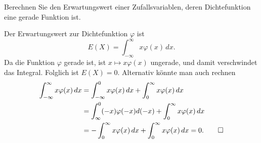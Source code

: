 Berechnen Sie den Erwartungswert einer Zufallsvariablen, deren
Dichtefunktion eine gerade Funktion ist.


\begin{loesung}
Der Erwartungswert zur Dichtefunktion $\varphi$ ist
\[
E(X)=\int_{-\infty}^\infty x\varphi(x)\,dx.
\]
Da die Funktion $\varphi$ gerade ist, ist $x\mapsto x\varphi(x)$
ungerade, und damit verschwindet das Integral. Folglich ist $E(X)=0$.
Alternativ könnte man auch rechnen
\begin{align*}
\int_{-\infty}^\infty x\varphi(x)\,dx
&=\int_{-\infty}^0x\varphi(x)\,dx +\int_0^\infty x\varphi(x)\,dx\\
&=\int_{\infty}^0(-x)\varphi(-x)d(-x)+\int_0^\infty x\varphi(x)\,dx\\
&=-\int_0^{\infty}x\varphi(x)\,dx+\int_0^\infty x\varphi(x)\,dx=0.
\qedhere
\end{align*}
\end{loesung}


